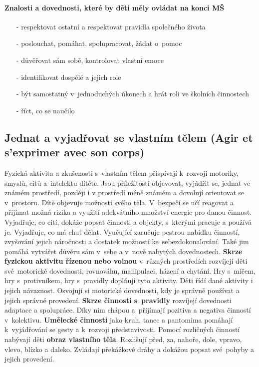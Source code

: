 			\paragraph{Znalosti a dovednosti, které by děti měly ovládat na konci MŠ}
			\begin{itemize}
				\setlength\itemsep{-2mm}
				\item[-] respektovat ostatní a respektovat pravidla společného života
				\item[-] poslouchat, pomáhat, spolupracovat, žádat o~pomoc
				\item[-] důvěřovat sám sobě, kontrolovat vlastní emoce
				\item[-] identifikovat dospělé a jejich role
				\item[-] být samostatný v jednoduchých úkonech a hrát roli ve školních činnostech
				\item[-] říct, co se naučilo
				\end{itemize}

		\subsection{Jednat a vyjadřovat se vlastním tělem (Agir et s'exprimer avec son corps)}

			Fyzická aktivita a zkušenosti s vlastním tělem přispívají k rozvoji motoriky, smyslů, citů a intelektu dítěte. Jsou příležitostí objevovat, vyjádřit se, jednat ve známém prostředí, později i v prostředí méně známém a dovolují orientovat se v prostoru. Dítě objevuje možnosti svého těla. V bezpečí se učí reagovat a přijímat možná rizika a využití adekvátního množství energie pro danou činnost. Vyjadřuje, co cítí, dokáže popsat činnosti a objekty, s kterými pracuje a používá je. Vyjadřuje, co má chuť dělat. Vyučující zaručuje  pestrou nabídku činností, zvyšování jejich náročnosti a dostatek možností ke sebezdokonalování. Také jim pomáhá vytvářet důvěru sám v sebe a v nově nabytých dovednostech. 
			\textbf{Skrze fyzickou aktivitu řízenou nebo volnou} v různých prostředích rozvíjejí děti své motorické dovednosti, rovnováhu, manipulaci, házení a chytání. Hry s míčem, hry s protivníkem, hry s pravidly doplňují tyto aktivity. Děti řídí dané aktivity i jejich návaznost. Osvojují si motorické dovednosti, kdy je správně používat a jejich správné provedení. 
			\textbf{Skrze činnosti s pravidly} rozvíjejí dovednosti adaptace a spolupráce. Díky nim chápou a přijímají pozitiva a negativa činností v kolektivu. 
			\textbf{Umělecké činnosti} jako kruh, tanec a pantomima pomáhají k vyjádřování se gesty a k~rozvoji představivosti.
			Pomocí rozličných činností nabývají děti \textbf{obraz vlastního těla}. Rozlišují před, za, nahoře, dole, vpravo, vlevo, blízko a daleko. Zvládají překážkové dráhy a dokážou popsat své pohyby a jejich provedení.
